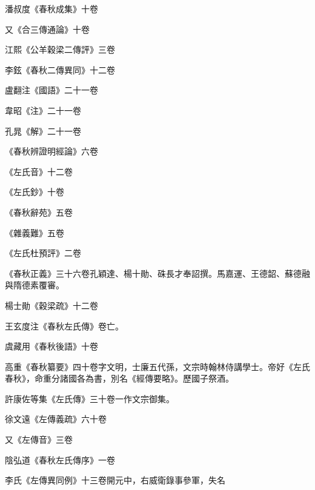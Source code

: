 \begin{pinyinscope}
 潘叔度《春秋成集》十卷



 又《合三傳通論》十卷



 江熙《公羊穀梁二傳評》三卷



 李鉉《春秋二傳異同》十二卷



 盧翻注《國語》二十一卷



 韋昭《注》二十一卷



 孔晁《解》二十一卷



 《春秋辨證明經論》六卷



 《左氏音》十二卷



 《左氏鈔》十卷



 《春秋辭苑》五卷



 《雜義難》五卷



 《左氏杜預評》二卷



 《春秋正義》三十六卷孔穎達、楊十勛、硃長才奉詔撰。馬嘉運、王德韶、蘇德融與隋德素覆審。



 楊士勛《穀梁疏》十二卷



 王玄度注《春秋左氏傳》卷亡。



 虞藏用《春秋後語》十卷



 高重《春秋纂要》四十卷字文明，士廉五代孫，文宗時翰林侍講學士。帝好《左氏春秋》，命重分諸國各為書，別名《經傳要略》。歷國子祭酒。



 許康佐等集《左氏傳》三十卷一作文宗御集。



 徐文遠《左傳義疏》六十卷



 又《左傳音》三卷



 陰弘道《春秋左氏傳序》一卷



 李氏《左傳異同例》十三卷開元中，右威衛錄事參軍，失名




\end{pinyinscope}
